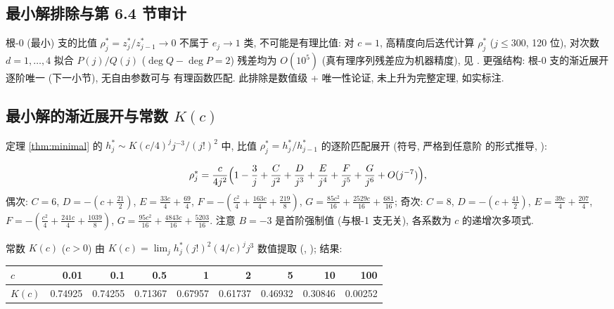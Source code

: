 \documentclass[UTF8]{ctexart}
\begin{document}
\subsection{最小解排除与第 6.4 节审计}

根-0 (最小) 支的比值 $\rho^*_j = z^*_j/z^*_{j-1} \to 0$ 不属于
$e_j \to 1$ 类, 不可能是有理比值: 对 $c = 1$, 高精度向后迭代计算
$\rho^*_j$ ($j \leq 300$, 120 位), 对次数 $d = 1, \dots, 4$ 拟合
$P(j)/Q(j)$ ($\deg Q - \deg P = 2$) 残差均为 $O(10^5)$
(真有理序列残差应为机器精度), 见 .
更强结构: 根-0 支的渐近展开逐阶唯一 (下一小节), 无自由参数可与
有理函数匹配. 此排除是数值级 + 唯一性论证, 未上升为完整定理,
如实标注.

\subsection{最小解的渐近展开与常数 $K(c)$}\label{sec:K}

定理 \ref{thm:minimal} 的 $h^*_j \sim K(c/4)^j j^{-3}/(j!)^2$ 中,
比值 $\rho^*_j = h^*_j/h^*_{j-1}$ 的逐阶匹配展开 (符号, 严格到任意阶
的形式推导, ):

\begin{equation}\label{eq:rhos}
	\rho^*_j = \frac{c}{4j^2}\Bigl(1 - \frac{3}{j} + \frac{C}{j^2}
	+ \frac{D}{j^3} + \frac{E}{j^4} + \frac{F}{j^5}
	+ \frac{G}{j^6} + O(j^{-7})\Bigr),
\end{equation}
偶次: $C = 6$, $D = -(c + \frac{21}{2})$, $E = \frac{33c}{4} + \frac{69}{4}$,
$F = -(\frac{c^2}{4} + \frac{163c}{4} + \frac{219}{8})$,
$G = \frac{85c^2}{16} + \frac{2529c}{16} + \frac{681}{16}$;
奇次: $C = 8$, $D = -(c + \frac{41}{2})$, $E = \frac{39c}{4} + \frac{207}{4}$,
$F = -(\frac{c^2}{4} + \frac{241c}{4} + \frac{1039}{8})$,
$G = \frac{95c^2}{16} + \frac{4843c}{16} + \frac{5203}{16}$.
注意 $B = -3$ 是首阶强制值 (与根-1 支无关), 各系数为 $c$ 的递增次多项式.

常数 $K(c)$ ($c > 0$) 由
$K(c) = \lim_j h^*_j (j!)^2 (4/c)^j j^3$ 数值提取 (,
); 结果:

\begin{center}\begin{tabular}{l|rrrrrrrr}
	$c$ & 0.01 & 0.1 & 0.5 & 1 & 2 & 5 & 10 & 100 \\\hline
	$K(c)$ & 0.74925 & 0.74255 & 0.71367 & 0.67957 & 0.61737 & 0.46932
		& 0.30846 & 0.00252
\end{tabular}\end{center}
\end{document}
